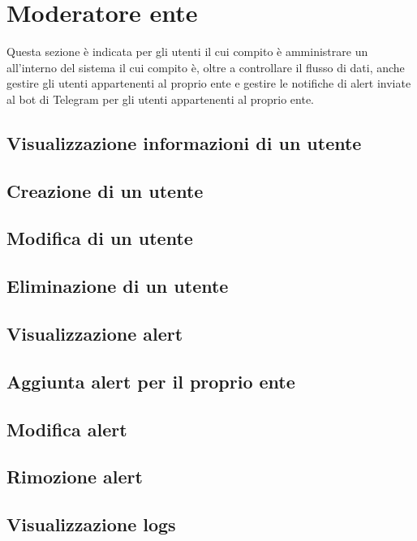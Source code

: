 \section{Moderatore ente}
Questa sezione è indicata per gli utenti il cui compito è amministrare un  all'interno del sistema il cui compito è, oltre a controllare il flusso di dati, anche gestire gli utenti appartenenti al proprio ente e gestire le notifiche di alert inviate al bot di Telegram per gli utenti appartenenti al proprio ente.

\subsection{Visualizzazione informazioni di un utente}
\subsection{Creazione di un utente}
\subsection{Modifica di un utente}
\subsection{Eliminazione di un utente}
\subsection{Visualizzazione alert}
\subsection{Aggiunta alert per il proprio ente}
\subsection{Modifica alert}
\subsection{Rimozione alert}
\subsection{Visualizzazione logs}